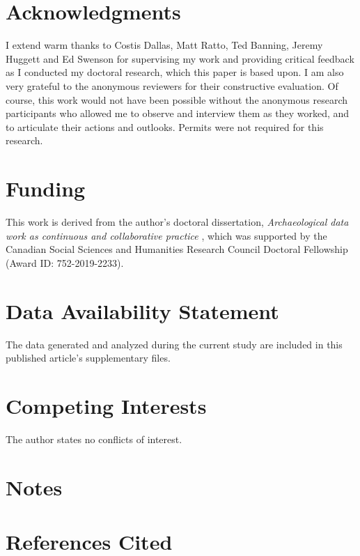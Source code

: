 \documentclass{article}
\begin{document}
\section{Acknowledgments}\label{acknowledgments}

I extend warm thanks to Costis Dallas, Matt Ratto, Ted Banning, Jeremy Huggett and Ed Swenson for supervising my work and providing critical feedback as I conducted my doctoral research, which this paper is based upon.
I am also very grateful to the anonymous reviewers for their constructive evaluation.
Of course, this work would not have been possible without the anonymous research participants who allowed me to observe and interview them as they worked, and to articulate their actions and outlooks.
Permits were not required for this research.

\section{Funding}\label{funding}

This work is derived from the author's doctoral dissertation, \emph{Archaeological data work as continuous and collaborative practice} \parencite{batist2023a}, which was supported by the Canadian Social Sciences and Humanities Research Council Doctoral Fellowship (Award ID: 752-2019-2233).

\section{Data Availability Statement}\label{data-availability-statement}
The data generated and analyzed during the current study are included in this published article's supplementary files.

\section{Competing Interests}\label{competing-interests}

The author states no conflicts of interest.

\newpage
\section{Notes}

\newpage
\section{References Cited}
\printbibliography[heading=none]
\end{document}
